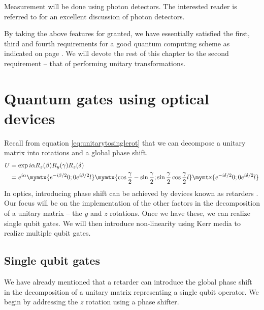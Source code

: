 Measurement will be done using photon detectors. The interested reader is referred to \cite{foxqoptics} for an excellent discussion of photon detectors.

By taking the above features for granted, we have essentially satisfied the first, third and fourth requirements for a good quantum computing scheme as indicated on page \pageref{requirements}. We will devote the rest of this chapter to the second requirement -- that of performing unitary transformations.

\section{Quantum gates using optical devices}
Recall from equation \eqref{eq:unitarytosinglerot} that we can decompose a unitary matrix into rotations and a global phase shift. 
\begin{align}
U &= \exp{i\alpha}R_z(\beta)R_y(\gamma)R_z(\delta)\\ 
&= e^{i\alpha}\mymtx{e^{-i\beta/2} 0 ; 0 e^{i\beta/2}l}
\mymtx{\cos\frac{\gamma}{2} -\sin\frac{\gamma}{2} ; \sin\frac{\gamma}{2} \cos\frac{\gamma}{2}l} 
\mymtx{e^{-i\delta/2} 0 ; 0 e^{i\delta/2}l}
\end{align}
In optics, introducing phase shift can be achieved by devices known as retarders \cite{hechtoptics}. Our focus will be on the implementation of the other factors in the decomposition of a unitary matrix -- the $y$ and $z$ rotations. Once we have these, we can realize single qubit gates. We will then introduce non-linearity using Kerr media to realize multiple qubit gates.

\subsection{Single qubit gates}
We have already mentioned that a retarder can introduce the global phase shift in the decomposition of a unitary matrix representing a single qubit operator. We begin by addressing the $z$ rotation using a phase shifter.

